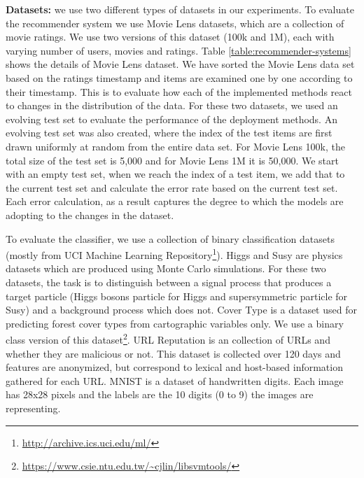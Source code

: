 \documentclass{vldb}
\begin{document}
\textbf{Datasets:} we use two different types of datasets in our experiments.
To evaluate the recommender system we use Movie Lens \cite{harper2016movielens} datasets, which are a collection of movie ratings.
We use two versions of this dataset (100k and 1M), each with varying number of users, movies and ratings.
Table \ref{table:recommender-systems} shows the details of Movie Lens dataset.
We have sorted the Movie Lens data set based on the ratings timestamp and items are examined one by one according to their timestamp.
This is to evaluate how each of the implemented methods react to changes in the distribution of the data.
For these two datasets, we used an evolving test set to evaluate the performance of the deployment methods.
An evolving test set was also created, where the index of the test items are first drawn uniformly at random from the entire data set.
For Movie Lens 100k, the total size of the test set is 5,000 and for Movie Lens 1M it is 50,000. 
We start with an empty test set, when we reach the index of a test item, we add that to the current test set and calculate the error rate based on the current test set.
Each error calculation, as a result captures the degree to which the models are adopting to the changes in the dataset.

To evaluate the classifier, we use a collection of binary classification datasets (mostly from UCI Machine Learning Repository\footnote{\url{http://archive.ics.uci.edu/ml/}}).
Higgs and Susy \cite{baldi2014searching} are physics datasets which are produced using Monte Carlo simulations.
For these two datasets, the task is to distinguish between a signal process that produces a target particle (Higgs bosons particle for Higgs and supersymmetric particle for Susy) and a background process which does not.
Cover Type \cite{collobert2002parallel} is a dataset used for predicting forest cover types from cartographic variables only.
We use a binary class version of this dataset\footnote{\url{https://www.csie.ntu.edu.tw/~cjlin/libsvmtools/}}.
URL Reputation \cite{ma2009identifying} is an collection of URLs and whether they are malicious or not.
This dataset is collected over 120 days and features are anonymized, but correspond to lexical and host-based information gathered for each URL.
MNIST \cite{lecun-mnist} is a dataset of handwritten digits.
Each image has 28x28 pixels and the labels are the 10 digits (0 to 9) the images are representing.
\end{document}
